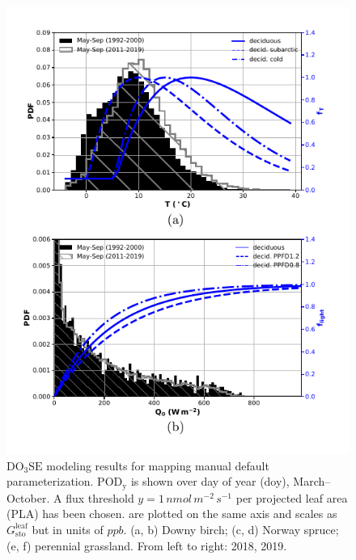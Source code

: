 \documentclass[bg, manuscript]{copernicus}
\begin{document}
\begin{figure}[t]
  \includegraphics[width=12cm]{figB4}
  \caption{$\mathrm{DO_3SE}$ modeling results for mapping manual default parameterization. $\mathrm{POD_y}$ is shown over day of year (\unit{doy}), March--October. A flux threshold $y=1\,\unit{nmol\,m^{-2}\,s^{-1}}$ per projected leaf area (PLA) has been chosen. \chem{[O_3]} are plotted on the same axis and scales as $G_\text{sto}^\text{leaf}$ but in units of $\unit{ppb}$. (a, b) Downy birch; (c, d) Norway spruce; (e, f) perennial grassland. From left to right: 2018, 2019.}
  \label{fig:pody_mm_composit}
\end{figure}


\noappendix       %


\end{document}
